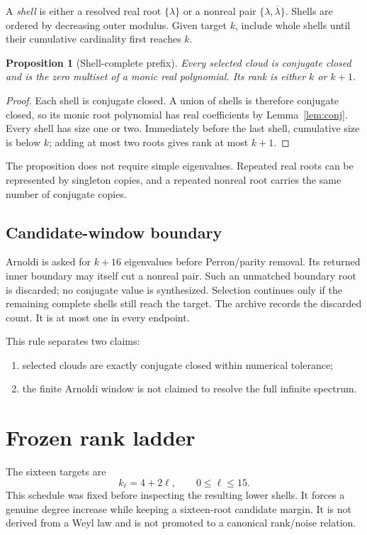 \documentclass[11pt]{article}
\newtheorem{proposition}[theorem]{Proposition}
\theoremstyle{remark}\newtheorem{remark}[theorem]{Remark}
\begin{document}
A \emph{shell} is either a resolved real root $\{\lambda\}$ or a nonreal pair
$\{\lambda,\overline\lambda\}$. Shells are ordered by decreasing outer
modulus. Given target $k$, include whole shells until their cumulative
cardinality first reaches $k$.

\begin{proposition}[Shell-complete prefix]\label{prop:prefix}
Every selected cloud is conjugate closed and is the zero multiset of a monic
real polynomial. Its rank is either $k$ or $k+1$.
\end{proposition}
\begin{proof}
Each shell is conjugate closed. A union of shells is therefore conjugate
closed, so its monic root polynomial has real coefficients by
Lemma~\ref{lem:conj}. Every shell has size one or two. Immediately before
the last shell, cumulative size is below $k$; adding at most two roots gives
rank at most $k+1$.
\end{proof}

The proposition does not require simple eigenvalues. Repeated real roots can
be represented by singleton copies, and a repeated nonreal root carries the
same number of conjugate copies.

\subsection{Candidate-window boundary}

Arnoldi is asked for $k+16$ eigenvalues before Perron/parity removal. Its
returned inner boundary may itself cut a nonreal pair. Such an unmatched
boundary root is discarded; no conjugate value is synthesized. Selection
continues only if the remaining complete shells still reach the target.
The archive records the discarded count. It is at most one in every endpoint.

This rule separates two claims:
\begin{enumerate}[leftmargin=2em]
\item selected clouds are exactly conjugate closed within numerical tolerance;
\item the finite Arnoldi window is not claimed to resolve the full infinite
spectrum.
\end{enumerate}

\section{Frozen rank ladder}

The sixteen targets are
\begin{equation}\label{eq:ranks}
 k_\ell=4+2\ell,\qquad 0\le\ell\le15.
\end{equation}
This schedule was fixed before inspecting the resulting lower shells. It
forces a genuine degree increase while keeping a sixteen-root candidate
margin. It is not derived from a Weyl law and is not promoted to a canonical
rank/noise relation.
\end{document}
